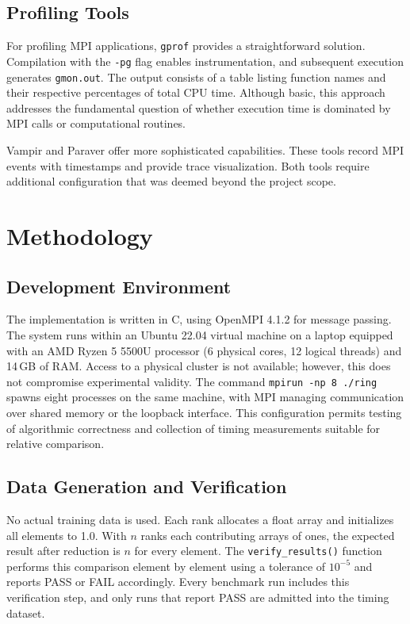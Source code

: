 \documentclass[12pt,a4paper]{article}
\begin{document}
\subsection{Profiling Tools}

For profiling MPI applications, \texttt{gprof} provides a straightforward solution. Compilation with the \texttt{-pg} flag enables instrumentation, and subsequent execution generates \texttt{gmon.out}. The output consists of a table listing function names and their respective percentages of total CPU time. Although basic, this approach addresses the fundamental question of whether execution time is dominated by MPI calls or computational routines.

Vampir and Paraver offer more sophisticated capabilities. These tools record MPI events with timestamps and provide trace visualization. Both tools require additional configuration that was deemed beyond the project scope.

\section{Methodology}

\subsection{Development Environment}

The implementation is written in C, using OpenMPI 4.1.2 for message passing. The system runs within an Ubuntu 22.04 virtual machine on a laptop equipped with an AMD Ryzen 5 5500U processor (6 physical cores, 12 logical threads) and 14\,GB of RAM. Access to a physical cluster is not available; however, this does not compromise experimental validity. The command \texttt{mpirun -np 8 ./ring} spawns eight processes on the same machine, with MPI managing communication over shared memory or the loopback interface. This configuration permits testing of algorithmic correctness and collection of timing measurements suitable for relative comparison.

\subsection{Data Generation and Verification}

No actual training data is used. Each rank allocates a float array and initializes all elements to 1.0. With $n$ ranks each contributing arrays of ones, the expected result after reduction is $n$ for every element. The \texttt{verify\_results()} function performs this comparison element by element using a tolerance of $10^{-5}$ and reports PASS or FAIL accordingly. Every benchmark run includes this verification step, and only runs that report PASS are admitted into the timing dataset.
\end{document}
